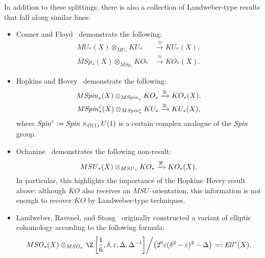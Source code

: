 In addition to these splittings, there is also a collection of Landweber-type results that fall along similar lines:
\begin{itemize}
    \item Conner and Floyd~\cite{ConnerFloyd} demonstrate the following:
    \begin{align*}
    MU_*(X) \otimes_{MU_*} KU_* & \xrightarrow\cong KU_*(X), \\
    M\mathit{Sp}_*(X) \otimes_{M\mathit{Sp}_*} KO_* & \xrightarrow\cong KO_*(X).
    \end{align*}
    \item Hopkins and Hovey~\cite[Theorem 1]{HopkinsHovey} demonstrate the following:
    \begin{align*}
    M\mathit{Spin}_*(X) \otimes_{M\mathit{Spin}_*} KO_* & \xrightarrow\cong KO_*(X), \\
    M\mathit{Spin}^c_*(X) \otimes_{M\mathit{Spin}^c_*} KU_* & \xrightarrow\cong KU_*(X),
    \end{align*}
    where \(\mathit{Spin}^c := \mathit{Spin} \times_{O(1)} U(1)\) is a certain complex analogue of the \(\mathit{Spin}\) group.
    \item Ochanine~\cite{OchanineSUModules} demonstrates the following non-result: \[M\mathit{SU}_*(X) \otimes_{M\mathit{SU}_*} KO_* \xrightarrow{\not\cong} KO_*(X).\]  In particular, this highlights the importance of the Hopkins--Hovey result above: although \(KO\) also receives an \(MSU\)--orientation, this information is not enough to recover \(KO\) by Landweber-type techniques.
    \item Landweber, Ravenel, and Stong~\cite{LandweberEll,LRS} originally constructed a variant of elliptic cohomology according to the following formula:  \[M\SO_*(X) \otimes_{M\SO_*} \left.\Z\left[\frac{1}{6}, \delta, \eps, \Delta, \Delta^{-1}\right] \middle/ \left(2^6 \eps (\delta^2 - \eps)^2 - \Delta\right)\right. =: \mathit{Ell}^*(X).\]
\end{itemize}

